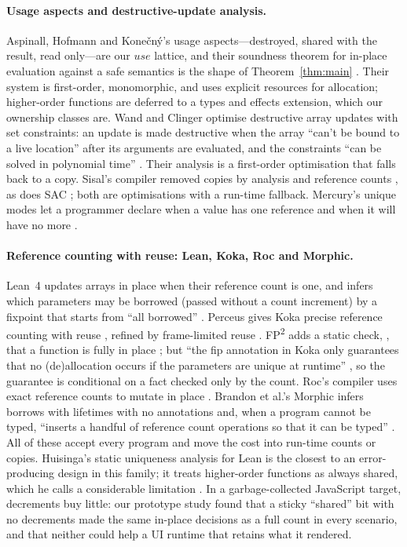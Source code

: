 \paragraph{Usage aspects and destructive-update analysis.} Aspinall, Hofmann and Kone\v{c}n\'y's usage
aspects---destroyed, shared with the result, read only---are our $\mathit{use}$ lattice, and their
soundness theorem for in-place evaluation against a safe semantics is the shape of
Theorem~\ref{thm:main} \citep{aspinall2002another,aspinall2008usage}. Their system is first-order,
monomorphic, and uses explicit resources for allocation; higher-order functions are deferred to a types
and effects extension, which our ownership classes are. Wand and Clinger optimise destructive array updates
with set constraints: an update is made destructive when the array ``can't be bound to a live location''
after its arguments are evaluated, and the constraints ``can be solved in polynomial time''
\citep{wand2001set}. Their analysis is a first-order optimisation that falls back to a copy. Sisal's
compiler removed copies by analysis and reference counts \citep{cann1990sisal}, as does SAC
\citep{grelck2006sac,grelck2004implicit}; both are optimisations with a run-time fallback. Mercury's unique
modes let a programmer declare when a value has one reference and when it will have no more
\citep{mercury2026unique}.

\paragraph{Reference counting with reuse: Lean, Koka, Roc and Morphic.} Lean~4 updates arrays in place
when their reference count is one, and infers which parameters may be borrowed (passed without a count
increment) by a fixpoint that starts from ``all borrowed'' \citep{ullrich2019beans,demoura2021lean4}.
Perceus gives Koka precise reference counting with reuse \citep{reinking2021perceus}, refined by
frame-limited reuse \citep{lorenzen2022frame}. FP\textsuperscript{2} adds a static check, , that
a function is fully in place \citep{lorenzen2023fp2}; but ``the fip annotation in Koka only guarantees that
no (de)allocation occurs if the parameters are unique at runtime'' \citep[\S3.1]{lorenzen2024bst}, so the
guarantee is conditional on a fact checked only by the count. Roc's compiler uses exact reference counts
to mutate in place \citep{teeuwissen2023roc}. Brandon et al.'s Morphic infers borrows with lifetimes with no
annotations and, when a program cannot be typed, ``inserts a handful of reference count operations so that
it can be typed'' \citep{brandon2026borrows}. All of these accept every program and move the cost into
run-time counts or copies. Huisinga's static uniqueness analysis for Lean is the closest to an
error-producing design in this family; it treats higher-order functions as always shared, which he calls a
considerable limitation \citep[\S4.1]{huisinga2023lean}. In a garbage-collected JavaScript target, decrements
buy little: our prototype study found that a sticky ``shared'' bit with no decrements made the same in-place
decisions as a full count in every scenario, and that neither could help a UI runtime that retains what it rendered.

